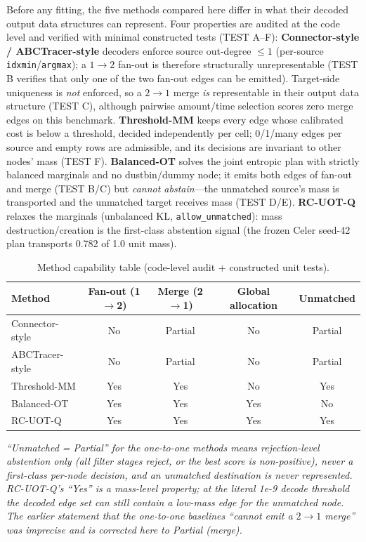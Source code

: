 Before any fitting, the five methods compared here differ in what their decoded output data structures can represent. Four properties are audited at the code level and verified with minimal constructed tests (TEST A--F): \textbf{Connector-style / ABCTracer-style} decoders enforce source out-degree $\le 1$ (per-source \texttt{idxmin}/\texttt{argmax}); a $1{\to}2$ fan-out is therefore structurally unrepresentable (TEST B verifies that only one of the two fan-out edges can be emitted). Target-side uniqueness is \emph{not} enforced, so a $2{\to}1$ merge \emph{is} representable in their output data structure (TEST C), although pairwise amount/time selection scores zero merge edges on this benchmark. \textbf{Threshold-MM} keeps every edge whose calibrated cost is below a threshold, decided independently per cell; 0/1/many edges per source and empty rows are admissible, and its decisions are invariant to other nodes' mass (TEST F). \textbf{Balanced-OT} solves the joint entropic plan with strictly balanced marginals and no dustbin/dummy node; it emits both edges of fan-out and merge (TEST B/C) but \emph{cannot abstain}---the unmatched source's mass is transported and the unmatched target receives mass (TEST D/E). \textbf{RC-UOT-Q} relaxes the marginals (unbalanced KL, \texttt{allow\_unmatched}): mass destruction/creation is the first-class abstention signal (the frozen Celer seed-42 plan transports 0.782 of 1.0 unit mass).

\begin{table}[!t]
\caption{Method capability table (code-level audit + constructed unit tests).}
\label{tab:capability}
\centering
\begin{tabular}{lcccc}
\toprule
Method & Fan-out (1$\to$2) & Merge (2$\to$1) & Global allocation & Unmatched \\
\midrule
Connector-style & No & Partial & No & Partial \\
ABCTracer-style & No & Partial & No & Partial \\
Threshold-MM & Yes & Yes & No & Yes \\
Balanced-OT & Yes & Yes & Yes & No \\
RC-UOT-Q & Yes & Yes & Yes & Yes \\
\bottomrule
\end{tabular}
\end{table}

\emph{``Unmatched = Partial'' for the one-to-one methods means rejection-level abstention only (all filter stages reject, or the best score is non-positive), never a first-class per-node decision, and an unmatched destination is never represented. RC-UOT-Q's ``Yes'' is a mass-level property; at the literal 1e-9 decode threshold the decoded edge set can still contain a low-mass edge for the unmatched node. The earlier statement that the one-to-one baselines ``cannot emit a $2{\to}1$ merge'' was imprecise and is corrected here to Partial (merge).}

